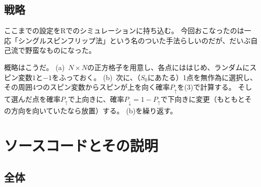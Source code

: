 \documentclass[fontsize = 12pt]{jlreq}
\begin{document}
\subsection{戦略} \label{s:1.2}

ここまでの設定をRでのシミュレーションに持ち込む。
今回おこなったのは一応「シングルスピンフリップ法」という名のついた手法らしいのだが、だいぶ自己流で野蛮なものになった。

概略はこうだ。
(a)~$N \times N$の正方格子を用意し、各点にははじめ、ランダムにスピン変数$1$と$-1$をふっておく。
(b)~次に、（$S_0$にあたる）1点を無作為に選択し、その周囲4つのスピン変数からスピンが上を向く確率$P_\uparrow$を(3)で計算する。
そして選んだ点を確率$P_\uparrow$で上向きに、確率$P_\downarrow = 1 - P_\uparrow$で下向きに変更（もともとその方向を向いていたなら放置）する。
(b)を繰り返す。

\section{ソースコードとその説明}

\subsection{全体}
\end{document}
